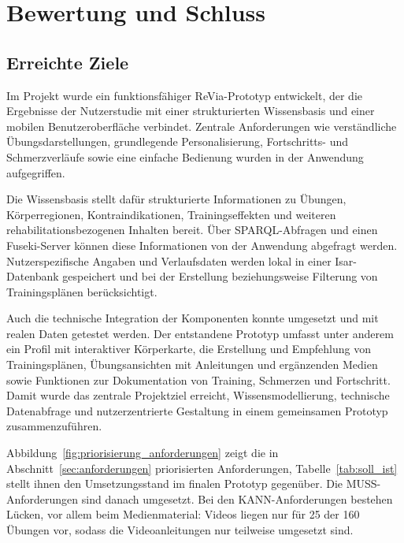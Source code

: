 \section{Bewertung und Schluss}

\subsection{Erreichte Ziele}

Im Projekt wurde ein funktionsfähiger ReVia-Prototyp entwickelt, der die Ergebnisse der Nutzerstudie mit einer strukturierten Wissensbasis und einer mobilen Benutzeroberfläche verbindet. Zentrale Anforderungen wie verständliche Übungsdarstellungen, grundlegende Personalisierung, Fortschritts- und Schmerzverläufe sowie eine einfache Bedienung wurden in der Anwendung aufgegriffen.

Die Wissensbasis stellt dafür strukturierte Informationen zu Übungen, Körperregionen, Kontraindikationen, Trainingseffekten und weiteren rehabilitationsbezogenen Inhalten bereit. Über SPARQL-Abfragen und einen Fuseki-Server können diese Informationen von der Anwendung abgefragt werden. Nutzerspezifische Angaben und Verlaufsdaten werden lokal in einer Isar-Datenbank gespeichert und bei der Erstellung beziehungsweise Filterung von Trainingsplänen berücksichtigt.

Auch die technische Integration der Komponenten konnte umgesetzt und mit realen Daten getestet werden. Der entstandene Prototyp umfasst unter anderem ein Profil mit interaktiver Körperkarte, die Erstellung und Empfehlung von Trainingsplänen, Übungsansichten mit Anleitungen und ergänzenden Medien sowie Funktionen zur Dokumentation von Training, Schmerzen und Fortschritt. Damit wurde das zentrale Projektziel erreicht, Wissensmodellierung, technische Datenabfrage und nutzerzentrierte Gestaltung in einem gemeinsamen Prototyp zusammenzuführen.

Abbildung~\ref{fig:priorisierung_anforderungen} zeigt die in Abschnitt~\ref{sec:anforderungen} priorisierten Anforderungen, Tabelle~\ref{tab:soll_ist} stellt ihnen den Umsetzungsstand im finalen Prototyp gegenüber. Die MUSS-Anforderungen sind danach umgesetzt. Bei den KANN-Anforderungen bestehen Lücken, vor allem beim Medienmaterial: Videos liegen nur für 25 der 160 Übungen vor, sodass die Videoanleitungen nur teilweise umgesetzt sind.

